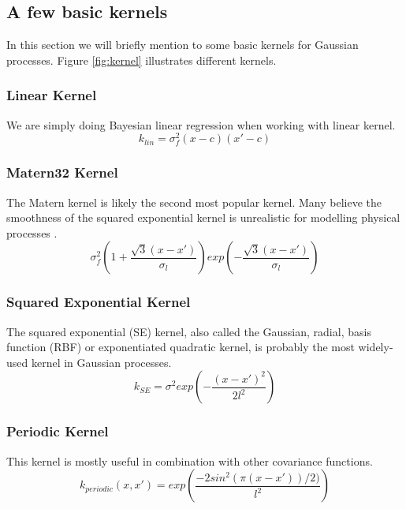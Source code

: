 \subsection{A few basic kernels}
In this section we will briefly mention to some basic kernels for Gaussian processes. Figure \ref{fig:kernel} illustrates different kernels.
\subsubsection{Linear Kernel}
We are simply doing Bayesian linear regression when working with linear kernel.
\begin{equation}
k_{lin} = \sigma_f^2(x-c)(x'-c)
\end{equation}

\subsubsection{Matern32 Kernel}
The Matern kernel is likely the second most popular kernel. Many believe the smoothness of the squared exponential kernel is unrealistic for modelling physical processes \cite{rasmussen2006gaussian}.
\begin{equation}
\sigma_f^2(1+\frac{\sqrt{3}(x-x')}{\sigma_l}) exp(-\frac{\sqrt{3}(x-x')}{\sigma_l})
\end{equation}

\subsubsection{Squared Exponential Kernel}
The squared exponential (SE) kernel, also called the Gaussian, radial, basis function (RBF) or exponentiated quadratic kernel, is probably the most widely-used kernel in Gaussian processes.
\begin{equation}
k_{SE} = \sigma^2 exp(-\frac{(x-x')^2}{2l^2})
\end{equation}

\subsubsection{Periodic Kernel}
This kernel is mostly useful in combination with other covariance functions.
\begin{equation}
k_{periodic}(x,x') = exp(\frac{-2 sin^2 (\pi(x-x'))/2)}{l^2})
\end{equation}

